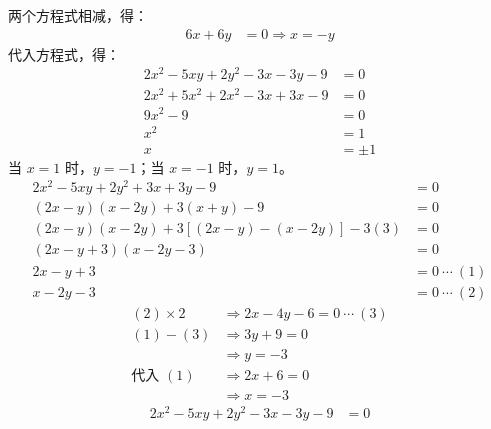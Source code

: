\documentclass[10pt]{article}
\begin{document}
\begin{enumerate}[leftmargin=*]
\begin{enumerate}
                两个方程式相减，得：
                \begin{align*}
                  6x + 6y & = 0 \Rightarrow x = -y
                \end{align*}
                代入方程式，得：
                \begin{align*}
                  2x^{2} - 5xy + 2y^{2} - 3x - 3y - 9    & = 0     \\
                  2x^{2} + 5x^{2} + 2x^{2} - 3x + 3x - 9 & = 0     \\
                  9x^{2} - 9                             & = 0     \\
                  x^{2}                                  & = 1     \\
                  x                                      & = \pm 1
                \end{align*}
                当 $x = 1$ 时，$y = -1$；当 $x = -1$ 时，$y = 1$。
                \begin{align*}
                  2x^{2} - 5xy + 2y^{2} + 3x + 3y - 9              & = 0              \\
                  (2x - y)(x - 2y) + 3(x + y) - 9                  & = 0              \\
                  (2x - y)(x - 2y) + 3[(2x - y) - (x - 2y)] - 3(3) & = 0              \\
                  (2x - y + 3)(x - 2y - 3)                         & = 0              \\
                  2x - y + 3                                       & = 0\ \cdots\ (1) \\
                  x - 2y - 3                                       & = 0\ \cdots\ (2)
                \end{align*}
                \begin{align*}
                  (2) \times 2  & \Rightarrow 2x - 4y - 6 = 0\ \cdots\ (3) \\
                  (1) - (3)     & \Rightarrow 3y + 9 = 0                   \\
                                & \Rightarrow y = -3                       \\
                  \text{代入 }(1) & \Rightarrow 2x + 6 = 0                   \\
                                & \Rightarrow x = -3
                \end{align*}
                \begin{align*}
                  2x^2 - 5xy + 2y^2 - 3x - 3y - 9                  & = 0              \\

\end{align*}
\end{enumerate}
\end{enumerate}
\end{document}
